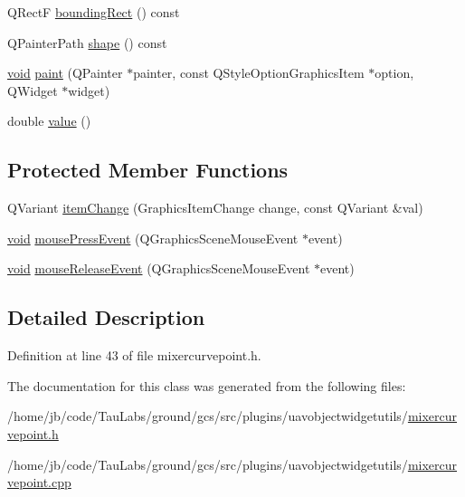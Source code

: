\begin{DoxyCompactItemize}
\item 
\-Q\-Rect\-F \hyperlink{group___u_a_v_object_widget_utils_ga016954be92f06c8ef2007526890e030e}{bounding\-Rect} () const 
\item 
\-Q\-Painter\-Path \hyperlink{group___u_a_v_object_widget_utils_gafbd32275c2089c42d00f43a0e17886ae}{shape} () const 
\item 
\hyperlink{group___u_a_v_objects_plugin_ga444cf2ff3f0ecbe028adce838d373f5c}{void} \hyperlink{group___u_a_v_object_widget_utils_gaa06d538612911f733082849ebbef3cb0}{paint} (\-Q\-Painter $\ast$painter, const \-Q\-Style\-Option\-Graphics\-Item $\ast$option, \-Q\-Widget $\ast$widget)
\item 
double \hyperlink{group___u_a_v_object_widget_utils_ga74c57bb80930c775e055d2759acb92fe}{value} ()
\end{DoxyCompactItemize}
\subsection*{\-Protected \-Member \-Functions}
\begin{DoxyCompactItemize}
\item 
\-Q\-Variant \hyperlink{group___u_a_v_object_widget_utils_ga4e95b04348d98dedd3493d466fb5bdf5}{item\-Change} (\-Graphics\-Item\-Change change, const \-Q\-Variant \&val)
\item 
\hyperlink{group___u_a_v_objects_plugin_ga444cf2ff3f0ecbe028adce838d373f5c}{void} \hyperlink{group___u_a_v_object_widget_utils_ga5b8710657e58b224928419c431d19fbc}{mouse\-Press\-Event} (\-Q\-Graphics\-Scene\-Mouse\-Event $\ast$event)
\item 
\hyperlink{group___u_a_v_objects_plugin_ga444cf2ff3f0ecbe028adce838d373f5c}{void} \hyperlink{group___u_a_v_object_widget_utils_ga82dc38bf127547b87931a58561f02a27}{mouse\-Release\-Event} (\-Q\-Graphics\-Scene\-Mouse\-Event $\ast$event)
\end{DoxyCompactItemize}


\subsection{\-Detailed \-Description}


\-Definition at line 43 of file mixercurvepoint.\-h.



\-The documentation for this class was generated from the following files\-:\begin{DoxyCompactItemize}
\item 
/home/jb/code/\-Tau\-Labs/ground/gcs/src/plugins/uavobjectwidgetutils/\hyperlink{mixercurvepoint_8h}{mixercurvepoint.\-h}\item 
/home/jb/code/\-Tau\-Labs/ground/gcs/src/plugins/uavobjectwidgetutils/\hyperlink{mixercurvepoint_8cpp}{mixercurvepoint.\-cpp}\end{DoxyCompactItemize}
